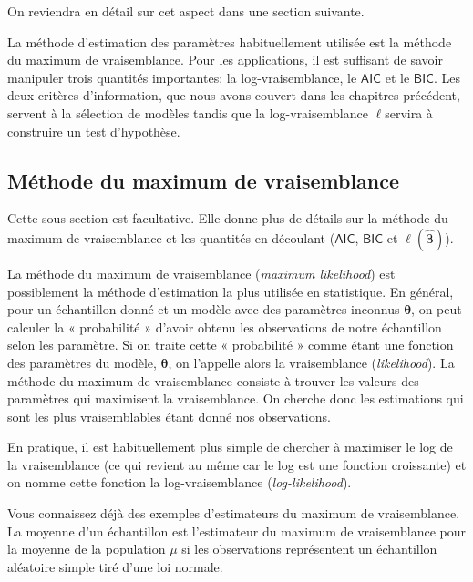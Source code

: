 \documentclass[
  11pt,
  letterpaper,
]{book}
\theoremstyle{definition}
\theoremstyle{definition}
\theoremstyle{definition}
\theoremstyle{remark}
\begin{document}
On reviendra en détail sur cet aspect dans une section suivante.

La méthode d'estimation des paramètres habituellement utilisée est la méthode du maximum de vraisemblance. Pour les applications, il est suffisant de savoir manipuler trois quantités importantes: la log-vraisemblance, le \(\mathsf{AIC}\) et le \(\mathsf{BIC}\). Les deux critères d'information, que nous avons couvert dans les chapitres précédent, servent à la sélection de modèles tandis que la log-vraisemblance \(\ell\)servira à construire un test d'hypothèse.

\hypertarget{muxe9thode-du-maximum-de-vraisemblance}{%
\subsection{Méthode du maximum de vraisemblance}\label{muxe9thode-du-maximum-de-vraisemblance}}

Cette sous-section est facultative. Elle donne plus de détails sur la méthode du maximum de vraisemblance et les quantités en découlant (\(\mathsf{AIC}\), \(\mathsf{BIC}\) et \(\ell(\widehat{\boldsymbol{\beta}})\)).

La méthode du maximum de vraisemblance (\emph{maximum likelihood}) est possiblement la méthode d'estimation la plus utilisée en statistique. En général, pour un échantillon donné et un modèle avec des paramètres inconnus \(\boldsymbol{\theta}\), on peut calculer la « probabilité » d'avoir obtenu les observations de notre échantillon selon les paramètre. Si on traite cette « probabilité » comme étant une fonction des paramètres du modèle, \(\boldsymbol{\theta}\), on l'appelle alors la vraisemblance (\emph{likelihood}). La méthode du maximum de vraisemblance consiste à trouver les valeurs des paramètres qui maximisent la vraisemblance. On cherche donc les estimations qui sont les plus vraisemblables étant donné nos observations.

En pratique, il est habituellement plus simple de chercher à maximiser le log de la vraisemblance (ce qui revient au même car le log est une fonction croissante) et on nomme cette fonction la log-vraisemblance (\emph{log-likelihood}).

Vous connaissez déjà des exemples d'estimateurs du maximum de vraisemblance. La moyenne d'un échantillon est l'estimateur du maximum de vraisemblance pour la moyenne de la population \(\mu\) si les observations représentent un échantillon aléatoire simple tiré d'une loi normale.
\end{document}
